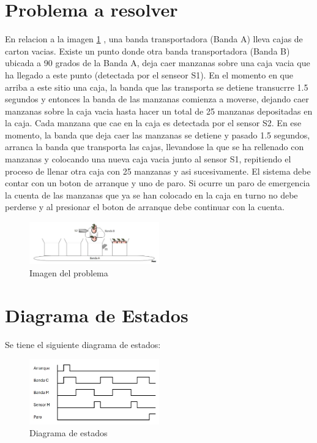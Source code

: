 \documentclass[12pt]{report}
\begin{document}
\section{Problema a resolver}
  En relacion a la imagen \ref{fig:imagenProblema} , una banda transportadora (Banda A) lleva cajas de carton vacias. Existe un punto donde otra banda transportadora (Banda B) ubicada a 90 grados de la Banda A, 
  deja caer manzanas sobre una caja vacia que ha llegado a este punto (detectada por el senseor S1).  En el momento en que arriba a este sitio una caja, la banda que las transporta se detiene transucrre 1.5 segundos y entonces la banda de las manzanas comienza a moverse, dejando caer manzanas sobre la caja vacia hasta hacer un total de 25 manzanas depositadas en la caja. Cada manzana que cae en la caja es detectada por el sensor S2.
  En ese momento, la banda que deja caer las manzanas se detiene y pasado 1.5 segundos, arranca la banda que transporta las cajas, llevandose la que se ha rellenado con manzanas y colocando una nueva caja vacia junto al sensor S1, repitiendo el proceso de llenar otra caja con 25 manzanas y asi sucesivamente.
  El sistema debe contar con un boton de arranque y uno de paro. Si ocurre un paro de emergencia la cuenta de las manzanas que ya se han colocado en la caja en turno no debe perderse y al presionar el boton de arranque debe continuar con la cuenta.
  \begin{figure}[H]
    \centering
    \includegraphics[width=0.5\textwidth]{screenshots/imageProblema.png}
    \caption{Imagen del problema}
    \label{fig:imagenProblema}
  \end{figure}
  \section{Diagrama de Estados}
  Se tiene el siguiente diagrama de estados:
  \begin{figure}[H]
    \centering
    \includegraphics[width=0.5\textwidth]{screenshots/diagrama.jpg}
    \caption{Diagrama de estados}
    \label{fig:estados}
  \end{figure}
\end{document}
